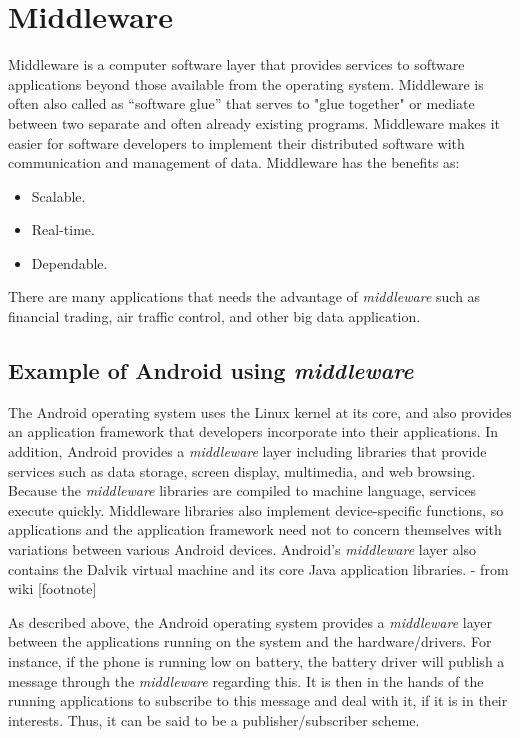 \section{Middleware}
Middleware is a computer software layer that provides services to software applications beyond those available from the operating system. Middleware is often also called as “software glue” that serves to "glue together" or mediate between two separate and often already existing programs. Middleware makes it easier for software developers to implement their distributed software with communication and management of data.
Middleware has the benefits as:

\begin{itemize}
\item Scalable.
\item Real-time.
\item Dependable.
\end{itemize}

There are many applications that needs the advantage of \emph{middleware} such as financial trading, air traffic control, and other big data application.

\subsection{Example of Android using \emph{middleware}}
The Android operating system uses the Linux kernel at its core, and also provides an application framework that developers incorporate into their applications. In addition, Android provides a \emph{middleware} layer including libraries that provide services such as data storage, screen display, multimedia, and web browsing. Because the \emph{middleware} libraries are compiled to machine language, services execute quickly. Middleware libraries also implement device-specific functions, so applications and the application framework need not to concern themselves with variations between various Android devices. Android’s \emph{middleware} layer also contains the Dalvik virtual machine and its core Java application libraries. - from wiki [footnote]

As described above, the Android operating system provides a \emph{middleware} layer between the applications running on the system and the hardware/drivers. For instance, if the phone is running low on battery, the battery driver will publish a message through the \emph{middleware} regarding this. It is then in the hands of the running applications to subscribe to this message and deal with it, if it is in their interests. Thus, it can be said to be a publisher/subscriber scheme.

